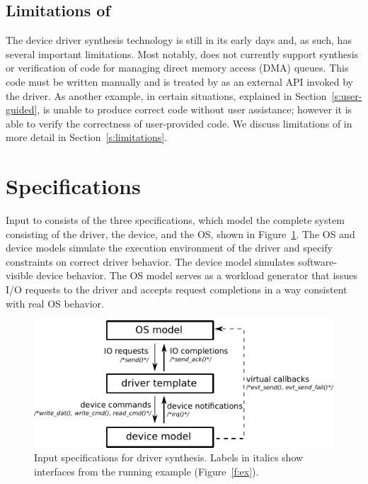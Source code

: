 \subsection{Limitations of \termite}  The device driver synthesis technology is still in its early days and, as such, has several important limitations.  Most notably, \termite does not currently support synthesis or verification of code for managing direct memory access (DMA) queues.  This code must be written manually and is treated by \termite as an external API invoked by the driver.  As another example, in certain situations, explained in Section~\ref{s:user-guided}, \termite is unable to produce correct code without user assistance; however it is able to verify the correctness of user-provided code.  We discuss limitations of \termite in more detail in Section~\ref{s:limitations}.

\section{Specifications}

\label{s:specifications}

Input to \termite consists of the three specifications, which model the complete system consisting of the driver, the device, and the OS, shown in Figure~\ref{f:actions}.  The OS and device models simulate the execution environment of the driver and specify constraints on correct driver behavior.  The device model simulates software-visible device behavior.  The OS model serves as a workload generator that issues I/O requests to the driver and accepts request completions in a way consistent with real OS behavior.

\begin{figure}
    \center
    \includegraphics[width=0.85\linewidth]{imgs/actions.pdf}
    \caption{Input specifications for driver synthesis.  
    Labels in italics show interfaces from the running example
    (Figure~\ref{f:ex}).}\label{f:actions}
\end{figure}


